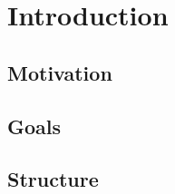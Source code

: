 \chapter{Introduction}

\section{Motivation}
\label{sec:motivation}

\section{Goals}
\label{sec:goals}

\section{Structure}
\label{sec:structure}

